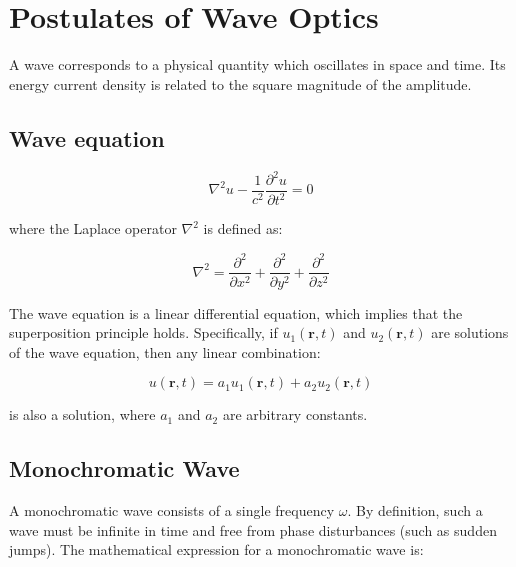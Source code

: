 \documentclass[
  a4paper,
]{book}
\begin{document}
\section{Postulates of Wave Optics}\label{postulates-of-wave-optics}

\begin{tcolorbox}[enhanced jigsaw, coltitle=black, title=\textcolor{quarto-callout-note-color}{\faInfo}\hspace{0.5em}{Wave}, colframe=quarto-callout-note-color-frame, toprule=.15mm, opacitybacktitle=0.6, left=2mm, opacityback=0, breakable, toptitle=1mm, bottomtitle=1mm, leftrule=.75mm, arc=.35mm, titlerule=0mm, colbacktitle=quarto-callout-note-color!10!white, rightrule=.15mm, bottomrule=.15mm, colback=white]

A wave corresponds to a physical quantity which oscillates in space and
time. Its energy current density is related to the square magnitude of
the amplitude.

\end{tcolorbox}

\subsection{Wave equation}\label{wave-equation}

\[
\nabla^2 u - \frac{1}{c^2}\frac{\partial^2 u}{\partial t^2}=0
\]

where the Laplace operator \(\nabla^2\) is defined as:

\[
\nabla^2 =\frac{\partial^2}{\partial x^2}+\frac{\partial^2}{\partial y^2}+\frac{\partial^2}{\partial z^2}
\]

The wave equation is a linear differential equation, which implies that
the superposition principle holds. Specifically, if
\(u_1(\mathbf{r},t)\) and \(u_2(\mathbf{r},t)\) are solutions of the
wave equation, then any linear combination:

\[
u(\mathbf{r},t)=a_1u_1(\mathbf{r},t)+a_2u_2(\mathbf{r},t)
\]

is also a solution, where \(a_1\) and \(a_2\) are arbitrary constants.

\subsection{Monochromatic Wave}\label{monochromatic-wave}

A monochromatic wave consists of a single frequency \(\omega\). By
definition, such a wave must be infinite in time and free from phase
disturbances (such as sudden jumps). The mathematical expression for a
monochromatic wave is:
\end{document}
